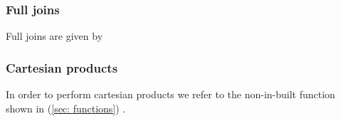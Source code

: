 \subsubsection*{Full joins}
Full joins are given by

\subsubsection*{Cartesian products}
In order to perform cartesian products 
we refer to the non-in-built function 
shown in (\ref{sec: functions}) 
.


